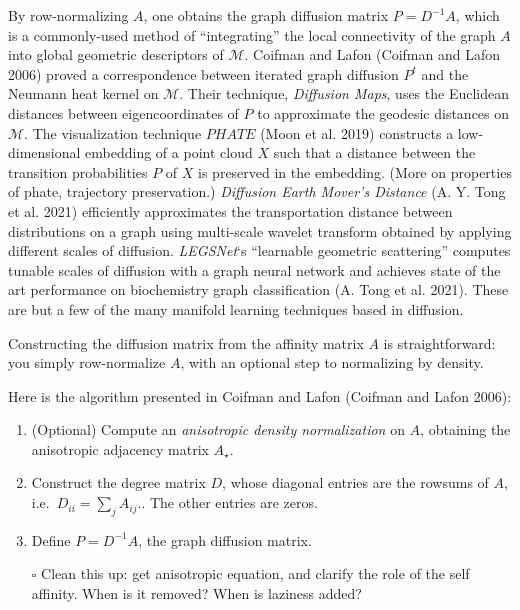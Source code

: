 \documentclass[
  letterpaper,
  DIV=11,
  numbers=noendperiod]{scrartcl}
\providecommand{\tightlist}{%
  \setlength{\itemsep}{0pt}\setlength{\parskip}{0pt}}\usepackage{longtable,booktabs,array}
\theoremstyle{plain}
\theoremstyle{definition}
\theoremstyle{plain}
\theoremstyle{definition}
\theoremstyle{plain}
\theoremstyle{remark}
\begin{document}
By row-normalizing \(A\), one obtains the graph diffusion matrix
\(P = D^{-1}A\), which is a commonly-used method of ``integrating'' the
local connectivity of the graph \(A\) into global geometric descriptors
of \(\mathcal{M}\). Coifman and Lafon (Coifman and Lafon 2006) proved a
correspondence between iterated graph diffusion \(P^t\) and the Neumann
heat kernel on \(\mathcal{M}\). Their technique, \emph{Diffusion Maps},
uses the Euclidean distances between eigencoordinates of \(P\) to
approximate the geodesic distances on \(\mathcal{M}\). The visualization
technique \(PHATE\) (Moon et al. 2019) constructs a low-dimensional
embedding of a point cloud \(X\) such that a distance between the
transition probabilities \(P\) of \(X\) is preserved in the embedding.
(More on properties of phate, trajectory preservation.) \emph{Diffusion
Earth Mover's Distance} (A. Y. Tong et al. 2021) efficiently
approximates the transportation distance between distributions on a
graph using multi-scale wavelet transform obtained by applying different
scales of diffusion. \emph{LEGSNet}`s ``learnable geometric scattering''
computes tunable scales of diffusion with a graph neural network and
achieves state of the art performance on biochemistry graph
classification (A. Tong et al. 2021). These are but a few of the many
manifold learning techniques based in diffusion.

Constructing the diffusion matrix from the affinity matrix \(A\) is
straightforward: you simply row-normalize \(A\), with an optional step
to normalizing by density.

Here is the algorithm presented in Coifman and Lafon (Coifman and Lafon
2006):

\begin{enumerate}
\def\labelenumi{\arabic{enumi}.}
\tightlist
\item
  (Optional) Compute an \emph{anisotropic density normalization} on
  \(A\), obtaining the anisotropic adjacency matrix \(A_{\star}\).
\item
  Construct the degree matrix \(D\), whose diagonal entries are the
  rowsums of \(A\), i.e.~\(D_{ii} = \sum_{j}A_{ij}\).. The other entries
  are zeros.
\item
  Define \(P = D^{-1} A\), the graph diffusion matrix.
\end{enumerate}

\begin{itemize}
\tightlist
\item[$\square$]
  Clean this up: get anisotropic equation, and clarify the role of the
  self affinity. When is it removed? When is laziness added?
\end{itemize}
\end{document}
